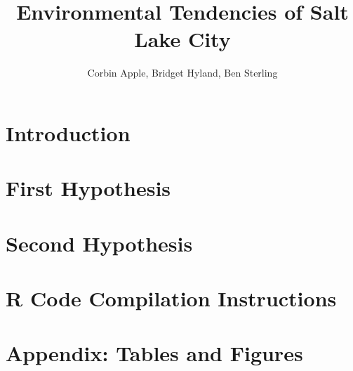 \documentclass[final]{siamart1116}
\title{Environmental Tendencies of Salt Lake City}
\author{Corbin Apple, Bridget Hyland, Ben Sterling}
\begin{document}
\maketitle

\section{Introduction}


\section{First Hypothesis}


\section{Second Hypothesis}


\section{R Code Compilation Instructions}





\section{Appendix: Tables and Figures}
\newpage


\end{document}
